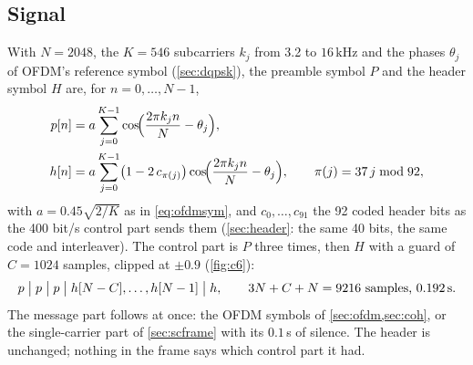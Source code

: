\documentclass[11pt,a4paper]{article}
\newcommand{\kHz}{\,\mathrm{kHz}}
\theoremstyle{remark}
\begin{document}
\subsection{Signal}
\label{sec:c6sig}
With $N = 2048$, the $K = 546$ subcarriers $k_j$ from 3.2 to $16\kHz$ and the phases $\theta_j$ of OFDM's reference symbol (\cref{sec:dqpsk}), the preamble symbol $P$ and the header symbol $H$ are, for $n = 0, \dots, N - 1$,
\begin{equation}
\begin{aligned}
p[n] &= a \sum_{j=0}^{K-1} \cos\!\Bigl(\frac{2\pi k_j n}{N} - \theta_j\Bigr),\\
h[n] &= a \sum_{j=0}^{K-1} \bigl(1 - 2\, c_{\pi(j)}\bigr) \cos\!\Bigl(\frac{2\pi k_j n}{N} - \theta_j\Bigr), \qquad \pi(j) = 37\, j \bmod 92,
\end{aligned}
\label{eq:c6sig}
\end{equation}
with $a = 0.45\sqrt{2/K}$ as in \cref{eq:ofdmsym}, and $c_0, \dots, c_{91}$ the 92 coded header bits as the 400 bit/s control part sends them (\cref{sec:header}: the same 40 bits, the same code and interleaver). The control part is $P$ three times, then $H$ with a guard of $C = 1024$ samples, clipped at $\pm 0.9$ (\cref{fig:c6}):
\[
p \;\big|\; p \;\big|\; p \;\big|\; h[N - C], \dots, h[N - 1] \;\big|\; h, \qquad 3N + C + N = 9216 \text{ samples, } 0.192\text{\,s}.
\]
The message part follows at once: the OFDM symbols of \cref{sec:ofdm,sec:coh}, or the single-carrier part of \cref{sec:scframe} with its $0.1$\,s of silence. The header is unchanged; nothing in the frame says which control part it had.
\end{document}
